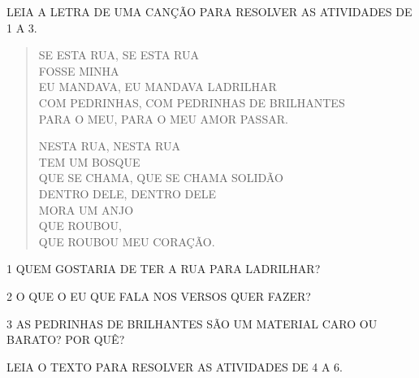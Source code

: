 
LEIA A LETRA DE UMA CANÇÃO PARA RESOLVER AS ATIVIDADES DE 1 A 3.

\begin{myquote}
\begin{verse}
SE ESTA RUA, SE ESTA RUA\\
FOSSE MINHA\\
EU MANDAVA, EU MANDAVA LADRILHAR\\
COM PEDRINHAS, COM PEDRINHAS DE BRILHANTES\\
PARA O MEU, PARA O MEU AMOR PASSAR.

NESTA RUA, NESTA RUA\\
TEM UM BOSQUE\\
QUE SE CHAMA, QUE SE CHAMA SOLIDÃO\\
DENTRO DELE, DENTRO DELE\\
MORA UM ANJO\\
QUE ROUBOU,\\
QUE ROUBOU MEU CORAÇÃO.
\end{verse}

\end{myquote}

\num{1} QUEM GOSTARIA DE TER A RUA PARA LADRILHAR?


\num{2} O QUE O EU QUE FALA NOS VERSOS QUER FAZER?


\num{3} AS PEDRINHAS DE BRILHANTES SÃO UM MATERIAL CARO OU BARATO? POR QUÊ?


LEIA O TEXTO PARA RESOLVER AS ATIVIDADES DE 4 A 6.

